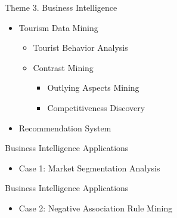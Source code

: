 \documentclass[
 size=14pt,
 paper=smartboard,  %
 mode=present, 		%
 display=slides, 	%
 style=tuliplab,  	%
 pauseslide,
 fleqn,leqno]{powerdot}
\begin{document}
\begin{slide}[toc=,bm=]{Theme 3. Business Intelligence}

\begin{itemize}
\item
Tourism Data Mining

\begin{itemize}
\item
Tourist Behavior Analysis

\item
Contrast Mining

\begin{itemize}

\item
Outlying Aspects Mining

\item
Competitiveness Discovery

\end{itemize}

\end{itemize}

\item
Recommendation System

\end{itemize}

\end{slide}


\begin{slide}[toc=,bm=]{Business Intelligence Applications}
\begin{itemize}
\item
Case 1: Market Segmentation Analysis
\end{itemize}

\end{slide}


\begin{slide}[toc=,bm=]{Business Intelligence Applications}
\begin{itemize}
\item
Case 2: Negative Association Rule Mining
\end{itemize}

\end{slide}
\end{document}
